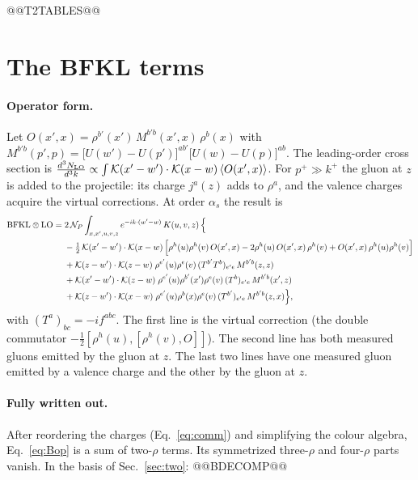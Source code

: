 \documentclass[10pt]{article}
\numberwithin{equation}{section}
\newcommand{\KK}{\mathcal K}
\newcommand{\NP}{\mathcal N_{P}}
\newcommand{\kp}{k^+}
\newcommand{\pp}{p^+}
\begin{document}
@@T2TABLES@@

\section{The BFKL terms}\label{sec:bfkl}
\paragraph{Operator form.} Let $O(x',x)=\rho^{b'}(x')\,M^{b'b}(x',x)\,\rho^b(x)$ with $M^{b'b}(p',p)=\big[U(w')-U(p')\big]^{ab'}\big[U(w)-U(p)\big]^{ab}$. The leading-order cross section is $\frac{d^3N_{\rm LO}}{d^3k}\propto\int\KK(x'-w')\cdot\KK(x-w)\,\langle O(x',x)\rangle$. For $\pp\gg\kp$ the gluon at $z$ is added to the projectile: its charge $j^a(z)$ adds to $\rho^a$, and the valence charges acquire the virtual corrections. At order $\alpha_s$ the result is
\begin{align}
\text{BFKL}\otimes\text{LO}={}&2\,\NP\int_{x,x',u,v,z}e^{-ik\cdot(w'-w)}\,K(u,v,z)\,\Big\{\notag\\
&-\tfrac12\,\KK(x'-w')\cdot\KK(x-w)\,\Big[\rho^h(u)\rho^h(v)\,O(x',x)-2\rho^h(u)\,O(x',x)\,\rho^h(v)+O(x',x)\,\rho^h(u)\rho^h(v)\Big]\notag\\
&+\KK(z-w')\cdot\KK(z-w)\;\rho^{e'}(u)\rho^e(v)\,(T^{b'}T^b)_{e'e}\,M^{b'b}(z,z)\notag\\
&+\KK(x'-w')\cdot\KK(z-w)\;\rho^{e'}(u)\rho^{b'}(x')\rho^e(v)\,(T^b)_{e'e}\,M^{b'b}(x',z)\notag\\
&+\KK(z-w')\cdot\KK(x-w)\;\rho^{e'}(u)\rho^{b}(x)\rho^e(v)\,(T^{b'})_{e'e}\,M^{b'b}(z,x)\Big\},
\label{eq:Bop}
\end{align}
with $(T^a)_{bc}=-if^{abc}$. The first line is the virtual correction (the double commutator $-\frac12[\rho^h(u),[\rho^h(v),O]]$). The second line has both measured gluons emitted by the gluon at $z$. The last two lines have one measured gluon emitted by a valence charge and the other by the gluon at $z$.

\paragraph{Fully written out.} After reordering the charges (Eq.~\eqref{eq:comm}) and simplifying the colour algebra, Eq.~\eqref{eq:Bop} is a sum of two-$\rho$ terms. Its symmetrized three-$\rho$ and four-$\rho$ parts vanish. In the basis of Sec.~\ref{sec:two}:
@@BDECOMP@@
\end{document}
